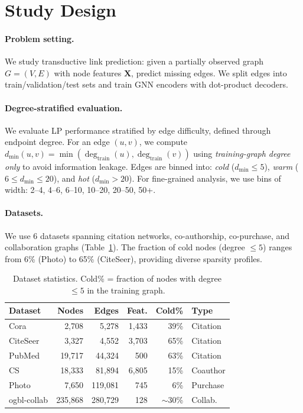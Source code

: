 \section{Study Design}
\label{sec:setup}

\paragraph{Problem setting.}
We study transductive link prediction: given a partially observed graph $G = (V, E)$ with node features $\mathbf{X}$, predict missing edges. We split edges into train/validation/test sets and train GNN encoders with dot-product decoders.

\paragraph{Degree-stratified evaluation.}
We evaluate LP performance stratified by edge difficulty, defined through endpoint degree. For an edge $(u, v)$, we compute $d_{\min}(u,v) = \min(\deg_{\text{train}}(u), \deg_{\text{train}}(v))$ using \emph{training-graph degree only} to avoid information leakage. Edges are binned into: \emph{cold} ($d_{\min} \leq 5$), \emph{warm} ($6 \leq d_{\min} \leq 20$), and \emph{hot} ($d_{\min} > 20$). For fine-grained analysis, we use bins of width: 2--4, 4--6, 6--10, 10--20, 20--50, 50+.

\paragraph{Datasets.}
We use 6 datasets spanning citation networks, co-authorship, co-purchase, and collaboration graphs (Table~\ref{tab:datasets}). The fraction of cold nodes (degree $\leq 5$) ranges from 6\% (Photo) to 65\% (CiteSeer), providing diverse sparsity profiles.

\begin{table}[t]
\centering
\small
\caption{Dataset statistics. Cold\% = fraction of nodes with degree $\leq 5$ in the training graph.}
\label{tab:datasets}
\begin{tabular}{lrrrrl}
\toprule
Dataset & Nodes & Edges & Feat. & Cold\% & Type \\
\midrule
Cora & 2,708 & 5,278 & 1,433 & 39\% & Citation \\
CiteSeer & 3,327 & 4,552 & 3,703 & 65\% & Citation \\
PubMed & 19,717 & 44,324 & 500 & 63\% & Citation \\
CS & 18,333 & 81,894 & 6,805 & 15\% & Coauthor \\
Photo & 7,650 & 119,081 & 745 & 6\% & Purchase \\
ogbl-collab & 235,868 & 280,729 & 128 & $\sim$30\% & Collab. \\
\bottomrule
\end{tabular}
\end{table}

